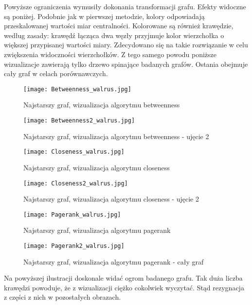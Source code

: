 Powyższe ograniczenia wymusiły dokonania transformacji grafu. Efekty widoczne są poniżej. Podobnie jak w pierwszej metodzie, kolory odpowiadają przeskalowanej wartości miar centralności. Kolorowane są również krawędzie, według zasady: krawędź łącząca dwa węzły przyjmuje kolor wierzchołka o większej przypisanej wartości miary. Zdecydowano się na takie rozwiązanie w celu zwiększenia widoczności wierzchołków. Z tego samego powodu poniższe wizualizacje zawierają tylko drzewo spinające badanych grafów. Ostania obejmuje cały graf w celach porównawczych. 

\FloatBarrier\FloatBarrier
\begin{figure}[h]
	\centering
	\texttt{[image: Betweenness\_walrus.jpg]}
	\caption{Najstarszy graf, wizualizacja algorytmu betweenness}
\end{figure}
\FloatBarrier\FloatBarrier
\FloatBarrier\FloatBarrier
\begin{figure}[h]
	\centering
	\texttt{[image: Betweenness2\_walrus.jpg]}
	\caption{Najstarszy graf, wizualizacja algorytmu betweenness - ujęcie 2}
\end{figure}
\FloatBarrier\FloatBarrier

\FloatBarrier\FloatBarrier
\begin{figure}[h]
	\centering
	\texttt{[image: Closeness\_walrus.jpg]}
	\caption{Najstarszy graf, wizualizacja algorytmu closeness}
\end{figure}
\FloatBarrier\FloatBarrier
\FloatBarrier\FloatBarrier
\begin{figure}[h]
	\centering
	\texttt{[image: Closeness2\_walrus.jpg]}
	\caption{Najstarszy graf, wizualizacja algorytmu closeness - ujęcie 2}
\end{figure}
\FloatBarrier\FloatBarrier        
\FloatBarrier\FloatBarrier
\begin{figure}[h]
	\centering
	\texttt{[image: Pagerank\_walrus.jpg]}
	\caption{Najstarszy graf, wizualizacja algorytmu pagerank}
\end{figure}
\FloatBarrier\FloatBarrier
\FloatBarrier\FloatBarrier
\begin{figure}[h]
	\centering
	\texttt{[image: Pagerank2\_walrus.jpg]}
	\caption{Najstarszy graf, wizualizacja algorytmu pagerank - cały graf}
\end{figure}
  

Na powyższej ilustracji doskonale widać ogrom badanego grafu. Tak duża liczba krawędzi powoduje, że z wizualizacji ciężko cokolwiek wyczytać. Stąd rezygnacja z części z nich w pozostałych obrazach.